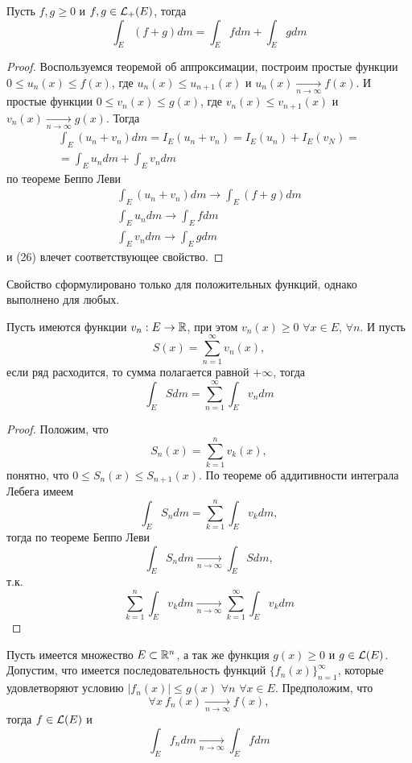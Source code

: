\documentclass[main]{subfiles}
\begin{document}
\begin{corollary}
    Пусть $f, g \ge 0$ и $f,g \in \mathcal{L}_+(E)$, тогда
    \[\int_E (f+g) dm = \int_E fdm + \int_E gdm\]
\end{corollary}
\begin{proof}
    Воспользуемся теоремой об аппроксимации, построим простые функции $0 \le u_n(x) \le f(x)$, где $u_n(x) \le u_{n+1}(x)$ и $u_n(x) \xrightarrow[n \to \infty]{} f(x)$.
    И простые функции $0 \le v_n(x) \le g(x)$, где $v_n(x) \le v_{n+1}(x)$ и $v_n(x) \xrightarrow[n \to \infty]{} g(x)$.
    Тогда
    \begin{multline*}
        \int_E (u_n + v_n) dm = I_E(u_n + v_n) = I_E(u_n) + I_E(v_N) =\\
        = \int_E u_n dm + \int_E v_n dm \tag{26}
    \end{multline*}
    по теореме Беппо Леви
    \begin{gather*}
        \int_E (u_n + v_n) dm \to \int_E (f + g) dm \\
        \int_E u_n dm \to \int_E f dm \\
        \int_E v_n dm \to \int_E g dm
    \end{gather*}
    и (26) влечет соответствующее свойство.
\end{proof}
\begin{remark}
    Свойство сформулировано только для положительных функций, однако выполнено для любых.
\end{remark}

\begin{theorem}
    Пусть имеются функции $v_n: E \to \mathbb{R}$, при этом $v_n(x) \ge 0$ $\forall x \in E$, $\forall n$.
    И пусть
    \[S(x) = \sum_{n=1}^{\infty} v_n(x),\]
    если ряд расходится, то сумма полагается равной $+\infty$, тогда
    \[\int_E S dm  = \sum_{n=1}^{\infty} \int_E v_n dm\]
\end{theorem}
\begin{proof}
    Положим, что
    \[S_n(x) = \sum_{k=1}^{n} v_k(x),\]
    понятно, что $0 \le S_n(x) \le S_{n+1}(x)$.
    По теореме об аддитивности интеграла Лебега имеем
    \[\int_E S_n dm = \sum_{k=1}^{n} \int_E v_k dm,\]
    тогда по теореме Беппо Леви
    \[\int_E S_n dm \xrightarrow[n \to \infty]{} \int_E S dm, \]
    т.к.
    \[\sum_{k=1}^{n} \int_E v_k dm \xrightarrow[n \to \infty]{} \sum_{k=1}^{\infty} \int_E v_k dm\]
\end{proof}

\begin{theorem}
    Пусть имеется множество $E \subset \mathbb{R}^n$, а так же функция $g(x) \ge 0$ и $g \in \mathcal{L}(E)$.
    Допустим, что имеется последовательность функций $\{f_n(x)\}_{n=1}^\infty$, которые удовлетворяют условию $|f_n(x)| \le g(x)$ $\forall n$ $\forall x \in E$.
    Предположим, что
    \[\forall x\ f_n(x) \xrightarrow[n \to \infty]{} f(x),\]
    тогда $f \in \mathcal{L}(E)$ и
    \[\int_E f_n dm \xrightarrow[n \to \infty]{} \int_E f dm\]
\end{theorem}
\end{document}
